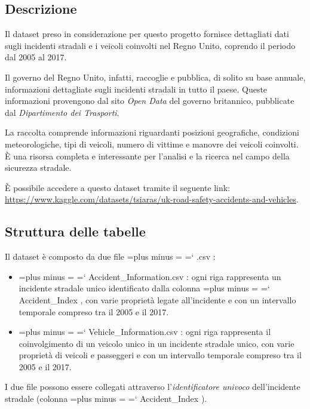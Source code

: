 \documentclass{article}
\renewcommand {\texttt}[1]{%
  \begingroup
    \spaceskip=\fontdimen2\font plus \fontdimen3\font minus \fontdimen4\font
    \xspaceskip=\fontdimen7\font\relax
    \ttfamily
    \hyphenchar\font=`\-
    #1
  \endgroup
}
\begin{document}

\subsection{Descrizione}

Il dataset preso in considerazione per questo progetto fornisce dettagliati dati sugli incidenti stradali e i veicoli coinvolti nel Regno Unito, coprendo il periodo dal 2005 al 2017.

Il governo del Regno Unito, infatti, raccoglie e pubblica, di solito su base annuale, informazioni dettagliate sugli incidenti stradali in tutto il paese. Queste informazioni provengono dal sito \textit{Open Data} del governo britannico, pubblicate dal \textit{Dipartimento dei Trasporti}.

La raccolta comprende informazioni riguardanti posizioni geografiche, condizioni meteorologiche, tipi di veicoli, numero di vittime e manovre dei veicoli coinvolti. È una risorsa completa e interessante per l'analisi e la ricerca nel campo della sicurezza stradale.

È possibile accedere a questo dataset tramite il seguente link: \url{https://www.kaggle.com/datasets/tsiaras/uk-road-safety-accidents-and-vehicles}.

\subsection{Struttura delle tabelle}

Il dataset è composto da due file \texttt{.csv}:

\begin{itemize}
    \item \texttt{Accident\_Information.csv}: ogni riga rappresenta un incidente stradale unico identificato dalla colonna \texttt{Accident\_Index}, con varie proprietà legate all'incidente e con un intervallo temporale compreso tra il 2005 e il 2017.
    \item \texttt{Vehicle\_Information.csv}: ogni riga rappresenta il coinvolgimento di un veicolo unico in un incidente stradale unico, con varie proprietà di veicoli e passeggeri e con un intervallo temporale compreso tra il 2005 e il 2017.
\end{itemize}

I due file possono essere collegati attraverso l'\textit{identificatore univoco} dell'incidente stradale (colonna \texttt{Accident\_Index}).
\end{document}
